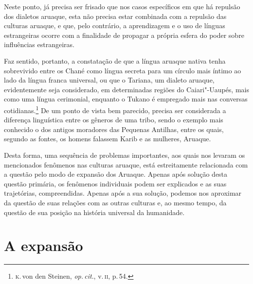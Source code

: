 Neste ponto, já precisa ser frisado que nos casos específicos em que há
repulsão dos dialetos aruaque, esta não precisa estar combinada com a
repulsão das culturas aruaque, e que, pelo contrário, a aprendizagem e o
uso de línguas estrangeiras ocorre com a finalidade de propagar a
própria esfera do poder sobre influências estrangeiras.

Faz sentido, portanto, a constatação de que a língua aruaque nativa tenha sobrevivido entre os Chané
como língua secreta para um círculo mais íntimo ao lado da língua franca universal,
ou que o Tariana, um dialeto aruaque, evidentemente seja considerado, em
determinadas regiões do Caiari"-Uaupés, mais como uma língua cerimonial,
enquanto o Tukano é empregado mais nas conversas cotidianas.\footnote{\textsc{k}.\,von den Steinen, \textit{op.\,cit}., v.\,\textsc{ii}, p.\,54.} De um ponto de vista bem
parecido, precisa ser considerada a diferença linguística entre os gêneros 
de uma tribo, sendo o exemplo mais conhecido o dos antigos
moradores das Pequenas Antilhas, entre os quais, segundo as fontes, os
homens falassem Karib e as mulheres, Aruaque.

Desta forma, uma sequência de problemas importantes, aos quais nos
levaram os mencionados fenômenos nas culturas aruaque, está
estreitamente relacionada com a questão pelo modo de expansão dos
Aruaque. Apenas após solução desta questão primária, os fenômenos
individuais podem ser explicados e as suas trajetórias, compreendidas.
Apenas após a sua solução, podemos nos aproximar da questão de suas
relações com as outras culturas e, ao mesmo tempo, da questão de sua
posição na história universal da humanidade.


\chapter*{A expansão\smallskip{}}

